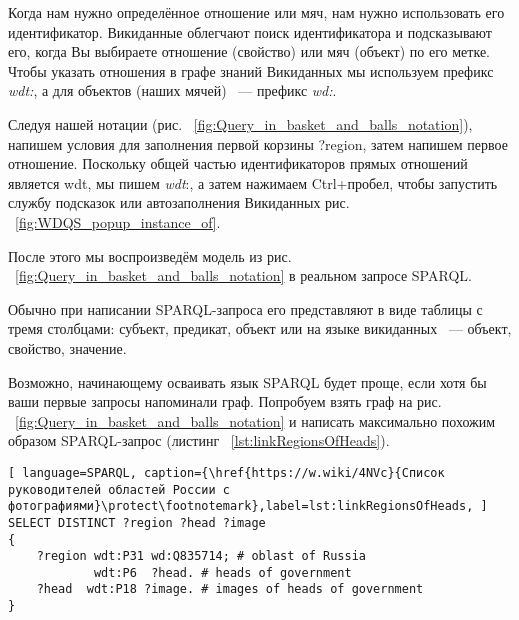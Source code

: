 Когда нам нужно определённое отношение или мяч, нам нужно использовать его идентификатор. Викиданные облегчают поиск идентификатора и подсказывают его, когда Вы выбираете отношение (свойство) или мяч (объект) по его метке. Чтобы указать отношения в графе знаний Викиданных мы используем префикс \textit{wdt:}, а для объектов (наших мячей) ~--- префикс \textit{wd:}.

Следуя нашей нотации (рис. ~\ref{fig:Query_in_basket_and_balls_notation}), напишем условия для заполнения первой корзины ?region, затем напишем первое отношение. Поскольку общей частью идентификаторов прямых отношений является wdt, мы пишем \textit{wdt}:, а затем нажимаем Ctrl+пробел, чтобы запустить службу подсказок или  автозаполнения Викиданных рис. ~\ref{fig:WDQS_popup_instance_of}.

\begin{marginfigure}[-2.5cm]
	{
		\setlength{\fboxsep}{0pt}%
		\setlength{\fboxrule}{1pt}%
	}
    \caption{С помощью команды Ctrl+пробел открылось выпадающее контекстное меню автозаполнения свойства Викиданых.}
	\label{fig:WDQS_popup_instance_of}
\end{marginfigure}

После этого мы воспроизведём модель из рис. ~\ref{fig:Query_in_basket_and_balls_notation} в реальном запросе SPARQL.

Обычно при написании SPARQL-запроса его представляют в виде таблицы с тремя столбцами: субъект, предикат, объект или на языке викиданных ~--- объект, свойство, значение.

Возможно, начинающему осваивать язык SPARQL будет проще, если хотя бы ваши первые запросы напоминали граф. Попробуем взять граф на рис. ~\ref{fig:Query_in_basket_and_balls_notation} и написать максимально похожим образом SPARQL-запрос (листинг ~\ref{lst:linkRegionsOfHeads}).

\begin{lstlisting}[ language=SPARQL, caption={\href{https://w.wiki/4NVc}{Список руководителей областей России с фотографиями}\protect\footnotemark},label=lst:linkRegionsOfHeads, ]
SELECT DISTINCT ?region ?head ?image
{
    ?region wdt:P31 wd:Q835714; # oblast of Russia
            wdt:P6  ?head. # heads of government
    ?head  wdt:P18 ?image. # images of heads of government
}
\end{lstlisting}

